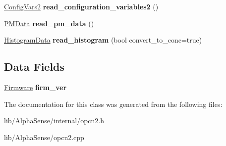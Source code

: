 \begin{DoxyCompactItemize}
\mbox{\label{classAlphaSense_1_1OPCN2_a36e4c025171b033b5c1b4bd1456d5a05}} 
\hyperlink{structAlphaSense_1_1ConfigVars2}{Config\+Vars2} {\bfseries read\+\_\+configuration\+\_\+variables2} ()
\item 
\mbox{\label{classAlphaSense_1_1OPCN2_a4cb2b8849d151f3f5fb3720531ce8b76}} 
\hyperlink{structAlphaSense_1_1PMData}{P\+M\+Data} {\bfseries read\+\_\+pm\+\_\+data} ()
\item 
\mbox{\label{classAlphaSense_1_1OPCN2_a21a4c46f8c615f0323d6149481ff6996}} 
\hyperlink{structAlphaSense_1_1HistogramData}{Histogram\+Data} {\bfseries read\+\_\+histogram} (bool convert\+\_\+to\+\_\+conc=true)
\end{DoxyCompactItemize}
\subsection*{Data Fields}
\begin{DoxyCompactItemize}
\item 
\mbox{\label{classAlphaSense_1_1OPCN2_a2bab53bb70bb2621208c758a28ef1c74}} 
\hyperlink{structAlphaSense_1_1Firmware}{Firmware} {\bfseries firm\+\_\+ver}
\end{DoxyCompactItemize}


The documentation for this class was generated from the following files\+:\begin{DoxyCompactItemize}
\item 
lib/\+Alpha\+Sense/internal/opcn2.\+h\item 
lib/\+Alpha\+Sense/opcn2.\+cpp\end{DoxyCompactItemize}
